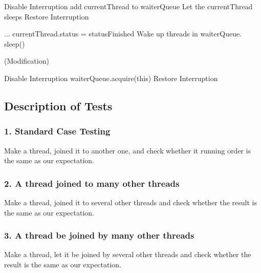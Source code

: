 \documentclass{article}
\begin{document}
	\begin{algorithm}[H]
		\begin{algorithmic}
   				\State Disable Interruption
					\State add currentThread to waiterQueue
					\State Let the currentThread sleeps
				\EndIf
				\State Restore Interruption
			\EndProcedure
		\end{algorithmic}
	\end{algorithm}
	
	\begin{algorithm}[H]
		\begin{algorithmic}
			\Procedure {finish()}{}
				\State ...
				\State currentThread.status = statusFinished
				\State Wake up threads in waiterQueue.
				\State sleep()
			\EndProcedure
		\end{algorithmic}
	\end{algorithm}
	
	(Modification)
	\begin{algorithm}[H]
		\begin{algorithmic}
			\Procedure {Init}{}
			\State Disable Interruption
			\State waiterQueue.acquire(this)
			\State Restore Interruption
			\EndProcedure
		\end{algorithmic}
	\end{algorithm}
	
	
	\subsection{Description of Tests}
	
	\subsubsection*{1. Standard Case Testing}
	Make a thread, joined it to another one, and check whether it running order is the same as our expectation.
	
	\subsubsection*{2. A thread joined to many other threads}
	Make a thread, joined it to several other threads and check whether the result is the same as our expectation.
	
	\subsubsection*{3. A thread be joined by many other threads}
	Make a thread, let it be joined by several other threads and check whether the result is the same as our expectation.
	
\end{document}
